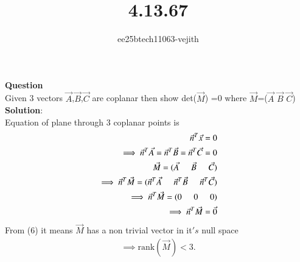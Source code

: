 \documentclass[journal]{IEEEtran}
\begin{document}

\vspace{3cm}

\title{4.13.67}
\author{ee25btech11063-vejith}

\maketitle
{\let\newpage\relax\maketitle}
\renewcommand{\thefigure}{\theenumi}
\renewcommand{\thetable}{\theenumi}
\setlength{\intextsep}{10pt} %
\textbf{Question}\\
Given 3 vectors $\Vec{A}$,$\Vec{B}$,$\Vec{C}$ are coplanar then show det($\Vec{M}$) =0 where $\Vec{M}$=($\Vec{A}$  $\Vec{B}$  $\Vec{C}$)\\
\textbf{Solution}:\\
Equation of plane through 3 coplanar points is 
\begin{align}
    \Vec{n}^T\Vec{x}=0\\
    \implies \Vec{n}^T\Vec{A}= \Vec{n}^T\Vec{B} = \Vec{n}^T\Vec{C}=0\\
    \Vec{M}=(\Vec{A} \hspace{0.5cm} \Vec{B} \hspace{0.5cm} \Vec{C})\\
    \implies \Vec{n}^T\Vec{M}=(\Vec{n}^T\Vec{A} \hspace{0.5cm}  \Vec{n}^T\Vec{B} \hspace{0.5cm} \Vec{n}^T\Vec{C})\\
    \implies \Vec{n}^T\Vec{M}=(0\hspace{0.5cm} 0 \hspace{0.5cm} 0)\\
    \implies \Vec{n}^T\Vec{M}=\Vec{0}
    \end{align}
From (6) it means $\Vec{M}$ has a non trivial vector in it$'s$ null space
\begin{align}
    \implies \text{rank}(\Vec{M})<3.
\end{align}
\end{document}
